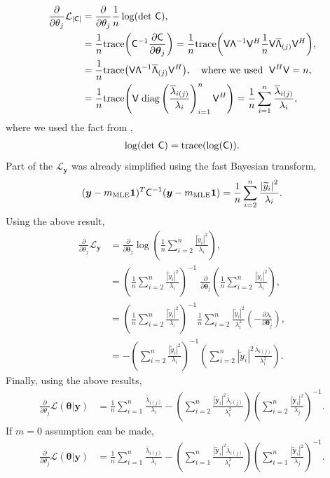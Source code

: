 \documentclass{iitthesis}          %
\newcommand{\bm}[1]{\boldsymbol{#1}}
\newcommand{\trace}[1]{\textup{trace}{#1}}
\newcommand{\vtheta}{{\bm{\theta}}}
\newcommand{\vy}{\bm{y}}
\newcommand{\tvy}{\tilde{\bm{y}}}
\newcommand{\vone}{\bm{1}}
\newcommand{\mC}{\mathsf{C}}
\newcommand{\mCInv}{{\mathsf{C}^{-1}}}
\newcommand{\mLambda}{\mathsf{\Lambda}}
\newcommand{\mV}{\mathsf{V}}
\newcommand{\MLE}{\textup{MLE}}
\newcommand{\diag}{\text{diag}}
\def\abs#1{\ensuremath{\left \lvert #1 \right \rvert}}
\begin{document}
\begin{align*}
\frac{\partial}{\partial \theta_j} \mathcal{L}_{\abs{\mC}} &= \frac{\partial}{\partial \theta_j}  \frac{1}{n} \log(\det\, \mC) ,
\\ & = \frac 1n \trace{\left( \mCInv \frac{\partial \mC}{\partial \vtheta_j} \right)}
 = \frac{1}{n}
\trace{\left( \mV {\mLambda}^{-1} \mV^H
\frac 1n \mV \overline{\mLambda}_{(j)} \mV^H
\right)},
\\
& = \frac{1}{n}
\trace{\left(
	 \mV {\mLambda}^{-1}  \overline{\mLambda}_{(j)} \mV^H
	\right)}, \quad \text{where we used } \; \mV^H \mV = n,
\\
& =\frac{1}{n}
\trace{\left(
	 \mV \;
	\diag\left( \frac{\overline{\lambda}_{i(j)}}{\lambda_i} \right)_{i=1}^n \mV^H
	\right)}
= \frac{1}{n} \sum_{i=1}^{n} \frac{\overline{\lambda}_{i(j)}}{\lambda_i},
\end{align*}
where we used the fact from \cite{Hig08},
\begin{align*}
\log(\det\, \mC)  = \trace{ (\log( \mC)) }.
\end{align*}
Part of the $\mathcal{L}_{\vy}$ was already simplified using the fast Bayesian transform,
\begin{align*}
{(\vy-m_\MLE\vone)^T\mCInv(\vy-m_\MLE\vone)} = \frac{1}{n} \sum_{i=2}^n \frac{\abs{\widetilde{y}_i}^2}{\lambda_i}.
\end{align*}
Using the above result,
\begin{align*}
\frac{\partial}{\partial \theta_j} \mathcal{L}_{\vy} 
&= \frac{\partial}{\partial \vtheta_j} \log\left(\frac{1}{n} \sum_{i=2}^n \frac{\abs{\widetilde{y}_i}^2}{\lambda_i} \right) ,
\\ 
&= \left(\frac{1}{n} \sum_{i=2}^n \frac{\abs{\widetilde{y}_i}^2}{\lambda_i}\right)^{-1}
\;
\frac{\partial}{\partial \vtheta_j} \left(\frac{1}{n} \sum_{i=2}^n \frac{\abs{\widetilde{y}_i}^2}{\lambda_i} \right) ,
\\ &= \left(
\frac{1}{n} \sum_{i=2}^n \frac{\abs{\widetilde{y}_i}^2}{\lambda_i} \right)^{-1} \frac{1}{n} \sum_{i=2}^n \frac{\abs{\widetilde{y}_i}^2}{\lambda_i^2}
\left( -\frac{\partial \lambda_i}{\partial \vtheta_j} \right),
\\ &= -\left(
\sum_{i=2}^n \frac{\abs{\widetilde{y}_i}^2}{\lambda_i} \right)^{-1} 
\left( \sum_{i=2}^n \abs{\widetilde{y}_i}^2 \frac{ \bar{ \lambda}_{i(j)} }{\lambda_i^2}
 \right).
\end{align*}
Finally, using the above results,
\begin{align*}
\frac{\partial}{\partial \theta_j} \mathcal{L}(\vtheta | \vy) 
&=  \frac 1n \sum_{i=1}^{n} \frac{\bar{\lambda}_{i(j)}}{\lambda_i}
- \left({ \sum_{i=2}^n \frac{\abs{\tvy_i}^2 \bar{\lambda}_{i(j)}}{\lambda_i^2}}\right)
\left( {\sum_{i=2}^n \frac{\abs{\tvy_i}^2}{\lambda_j}} \right)^{-1}.
\end{align*}
If $m=0$ assumption can be made,
\begin{align*}
\frac{\partial}{\partial \theta_j} \mathcal{L}(\vtheta | \vy) 
&=  \frac 1n \sum_{i=1}^{n} \frac{\bar{\lambda}_{i(j)}}{\lambda_i}
- \left({ \sum_{i=1}^n \frac{\abs{\tvy_i}^2 \bar{\lambda}_{i(j)}}{\lambda_i^2}}\right)
\left( {\sum_{i=1}^n \frac{\abs{\tvy_i}^2}{\lambda_j}} \right)^{-1}.
\end{align*}
\end{document}
